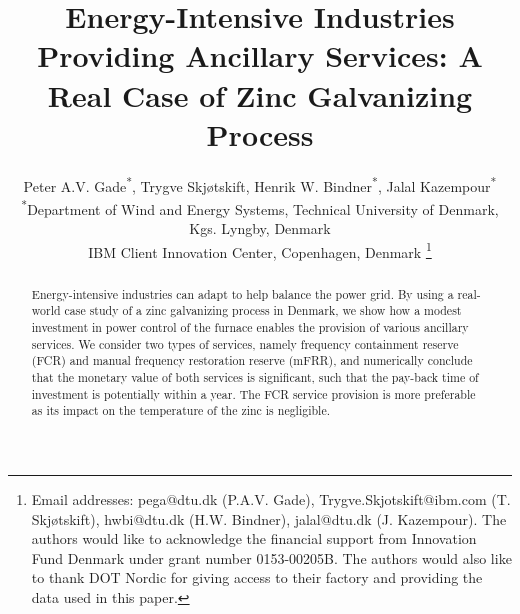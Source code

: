 \documentclass[conference]{IEEEtran}
\begin{document}
\title{Energy-Intensive Industries Providing Ancillary Services: A  Real Case of Zinc Galvanizing Process}

\author{Peter A.V. Gade\textsuperscript{*}\textsuperscript{\textdagger}, Trygve Skjøtskift\textsuperscript{\textdagger}, Henrik W. Bindner\textsuperscript{*}, Jalal Kazempour\textsuperscript{*} \\
    \textsuperscript{*}Department of Wind and Energy Systems, Technical University of Denmark, Kgs. Lyngby, Denmark \\
    \textsuperscript{\textdagger}IBM Client Innovation Center, Copenhagen, Denmark
    \thanks{
        Email addresses: pega@dtu.dk (P.A.V. Gade), Trygve.Skjotskift@ibm.com (T. Skjøtskift), hwbi@dtu.dk (H.W. Bindner), jalal@dtu.dk (J. Kazempour). The authors would like to acknowledge the financial support from Innovation Fund Denmark under grant number 0153-00205B. The authors would also like to thank DOT Nordic for giving access to their factory and providing the data used in this paper.}%

    \vspace{-3mm}
}

\maketitle

\IEEEaftertitletext{\vspace{-0.8\baselineskip}}
\maketitle

\begin{abstract}
    Energy-intensive industries can adapt to help balance the power grid. %
    By using a real-world case study of a zinc galvanizing process in Denmark, we show how a modest investment in power control of the furnace enables the provision of various ancillary services. We consider two types of services, namely frequency containment reserve (FCR) and manual frequency restoration reserve (mFRR), and numerically conclude that the monetary value of both services is significant, such that the pay-back time of investment is potentially within a year. The FCR service provision is more preferable as its impact on the temperature of the zinc is negligible.
\end{abstract}
\end{document}
